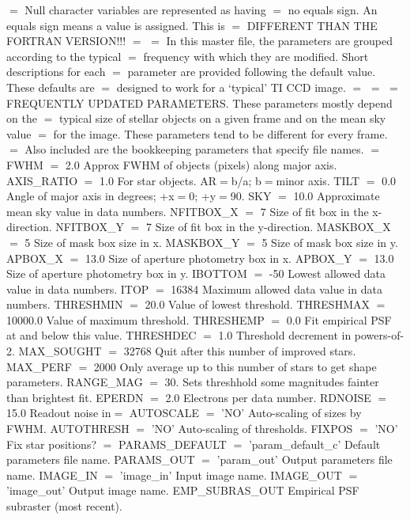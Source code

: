 {{$=$  Null character variables are represented as having
$=$  no equals sign.  An equals sign means a value is assigned. This is
$=$  DIFFERENT THAN THE FORTRAN VERSION!!!
$=$
$=$  In this master file, the parameters are grouped according to the typical
$=$  frequency with which they are modified.  Short descriptions for each
$=$  parameter are provided following the default value.   These defaults are
$=$  designed to work for a `typical' TI CCD image.
$=$
$=$
$=$  FREQUENTLY UPDATED PARAMETERS.  These parameters mostly depend on the
$=$  typical size of stellar objects on a given frame and on the mean sky value
$=$  for the image.  These parameters tend to be different for every frame.
$=$  Also included are the bookkeeping parameters that specify file names.
$=$
FWHM $=$ 2.0             Approx FWHM of objects (pixels) along major axis.
AXIS\_RATIO $=$ 1.0       For star objects.  AR$=$b/a; b$=$minor axis.
TILT $=$ 0.0             Angle of major axis in degrees; +x$=$0; +y$=$90.
SKY $=$ 10.0             Approximate mean sky value in data numbers.
NFITBOX\_X $=$ 7          Size of fit box in the x-direction.
NFITBOX\_Y $=$ 7          Size of fit box in the y-direction.
MASKBOX\_X $=$ 5          Size of mask box size in x.
MASKBOX\_Y $=$ 5          Size of mask box size in y.
APBOX\_X $=$ 13.0         Size of aperture photometry box in x.
APBOX\_Y $=$ 13.0         Size of aperture photometry box in y.
IBOTTOM $=$ -50          Lowest allowed data value in data numbers.
ITOP $=$ 16384           Maximum allowed data value in data numbers.
THRESHMIN $=$ 20.0       Value of lowest threshold.
THRESHMAX $=$ 10000.0    Value of maximum threshold.
THRESHEMP $=$ 0.0        Fit empirical PSF at and below this value.
THRESHDEC $=$ 1.0        Threshold decrement in powers-of-2.
MAX\_SOUGHT $=$ 32768     Quit after this number of improved stars.
MAX\_PERF  $=$ 2000       Only average up to this number of stars to get shape parameters.
RANGE\_MAG $=$ 30.        Sets threshhold some magnitudes fainter than brightest fit.
EPERDN $=$ 2.0           Electrons per data number.
RDNOISE $=$ 15.0         Readout noise in$=$
AUTOSCALE $=$ 'NO'       Auto-scaling of sizes by FWHM.
AUTOTHRESH $=$ 'NO'      Auto-scaling of thresholds.
FIXPOS $=$ 'NO'          Fix star positions?
$=$
PARAMS\_DEFAULT $=$ 'param\_default\_c'  Default parameters file name.
PARAMS\_OUT $=$ 'param\_out'             Output parameters file name.
IMAGE\_IN $=$ 'image\_in'                Input image name.
IMAGE\_OUT $=$ 'image\_out'              Output image name.
EMP\_SUBRAS\_OUT                       Empirical PSF subraster (most recent).
}}
